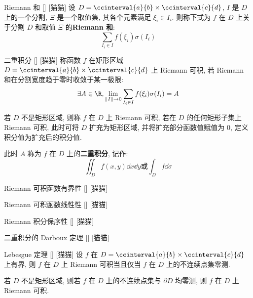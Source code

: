 \documentclass[UTF8]{ctexart}
\begin{document}
			\begin{dfn}
			    []
			    {Riemann 和}
			    []
			    [猫猫]
				设 \(D=\ccinterval{a}{b}\times\ccinterval{c}{d}\), \(I\) 是 \(D\) 上的一个分割, \(\Xi\) 是一个取值集, 其各个元素满足 \(\xi_i\in I_i\). 则称下式为 \(f\) 在 \(D\) 上关于分割 \(D\) 和取值 \(\Xi\) 的\textbf{Riemann 和}: 
				\[\sum_{I_i\in I}f(\xi_i)\sigma(I_i)\]
			\end{dfn}

			\begin{dfn}
			    []
			    {二重积分}
			    []
			    [猫猫]
				称函数 \(f\) 在矩形区域 \(D=\ccinterval{a}{b}\times\ccinterval{c}{d}\) 上 Riemann 可积, 若 Riemann 和在分割宽度趋于零时收敛于某一极限:
				\[\exists A\in\R, \lim_{\|I\|\to 0}\sum_{I_i\in I}f(\xi_i)\sigma(I_i)=A\]

				若 \(D\) 不是矩形区域, 则称 \(f\) 在 \(D\) 上 Riemann 可积, 若在 \(D\) 的任何矩形子集上 Riemann 可积, 此时可将 \(D\) 扩充为矩形区域, 并将扩充部分函数值赋值为 \(0\), 定义积分值为扩充后的积分值. 

				此时 \(A\) 称为 \(f\) 在 \(D\) 上的\textbf{二重积分}, 记作: 
				\[\iint_{D}f(x,y)\dd x\dd y\text{或}\int_{D}f\dd\sigma\]
			\end{dfn}

			\begin{ppt}
			    []
			    {Riemann 可积函数有界性}
			    []
			    [猫猫]
			\end{ppt}
			
			\begin{ppt}
			    []
			    {Riemann 可积函数线性性}
			    []
			    [猫猫]
			\end{ppt}

			\begin{ppt}
			    []
			    {Riemann 积分保序性}
			    []
			    [猫猫]
			\end{ppt}

			\begin{thm}
			    []
			    {二重积分的 Darboux 定理}
			    []
			    [猫猫]
			\end{thm}

			\begin{thm}
			    []
			    {Lebesgue 定理}
			    []
			    [猫猫]
				设 \(f\) 在 \(D=\ccinterval{a}{b}\times\ccinterval{c}{d}\) 上有界, 则 \(f\) 在 \(D\) 上 Riemann 可积当且仅当 \(f\) 在 \(D\) 上的不连续点集零测. 

				若 \(D\) 不是矩形区域, 则若 \(f\) 在 \(D\) 上的不连续点集与 \(\partial D\) 均零测, 则 \(f\) 在 \(D\) 上 Riemann 可积. 
			\end{thm}
\end{document}
